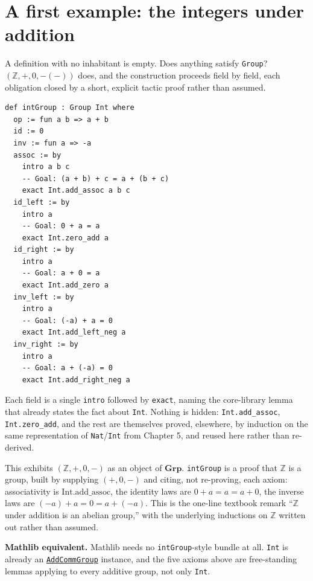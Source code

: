 \section{A first example: the integers under addition}\label{sec:07-groups:03-integers-example:1}

A definition with no inhabitant is empty. Does anything satisfy \texttt{Group}? \((\mathbb{Z}, +, 0, -(-))\) does, and the construction proceeds field by field, each obligation closed by a short, explicit tactic proof rather than assumed.

\begin{lstlisting}
def intGroup : Group Int where
  op := fun a b => a + b
  id := 0
  inv := fun a => -a
  assoc := by
    intro a b c
    -- Goal: (a + b) + c = a + (b + c)
    exact Int.add_assoc a b c
  id_left := by
    intro a
    -- Goal: 0 + a = a
    exact Int.zero_add a
  id_right := by
    intro a
    -- Goal: a + 0 = a
    exact Int.add_zero a
  inv_left := by
    intro a
    -- Goal: (-a) + a = 0
    exact Int.add_left_neg a
  inv_right := by
    intro a
    -- Goal: a + (-a) = 0
    exact Int.add_right_neg a
\end{lstlisting}

Each field is a single \texttt{intro} followed by \texttt{exact}, naming the core-library lemma that already states the fact about \texttt{Int}. Nothing is hidden: \texttt{Int.add\_\allowbreak{}assoc}, \texttt{Int.zero\_\allowbreak{}add}, and the rest are themselves proved, elsewhere, by induction on the same representation of \texttt{Nat}/\texttt{Int} from Chapter 5, and reused here rather than re-derived.

\begin{mathreading}

This exhibits \((\mathbb{Z}, +, 0, -)\) as an object of \(\mathbf{Grp}\). \texttt{intGroup} is a proof that \(\mathbb{Z}\) is a group, built by supplying \((+, 0, -)\) and citing, not re-proving, each axiom: associativity is \(\mathrm{Int.add\_assoc}\), the identity laws are \(0 + a = a = a + 0\), the inverse laws are \((-a) + a = 0 = a + (-a)\). This is the one-line textbook remark ``\(\mathbb{Z}\) under addition is an abelian group,'' with the underlying inductions on \(\mathbb{Z}\) written out rather than assumed.

\end{mathreading}

\textbf{Mathlib equivalent.} Mathlib needs no \texttt{intGroup}-style bundle at all. \texttt{Int} is already an \href{https://loogle.lean-lang.org/?q=AddCommGroup}{\texttt{AddCommGroup}} instance, and the five axioms above are free-standing lemmas applying to every additive group, not only \texttt{Int}.

